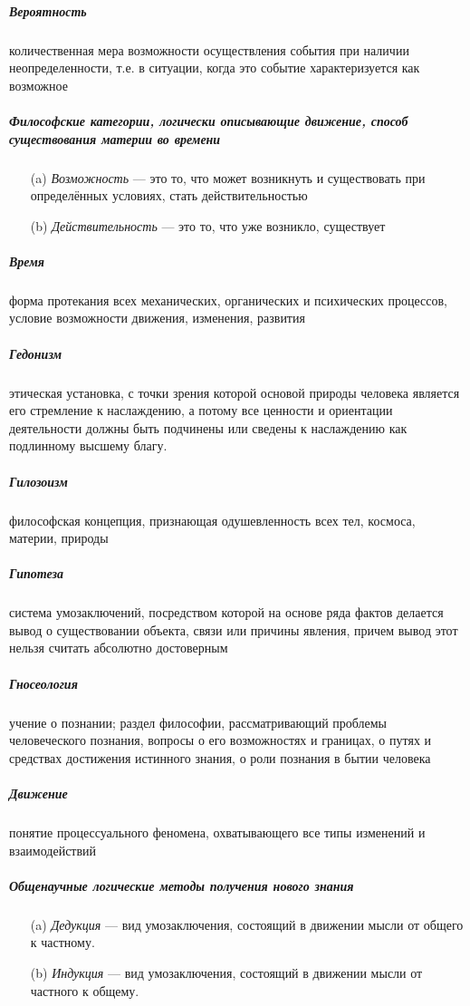 \documentclass[a4paper, 12pt]{article}
\theoremstyle{plain} %
\theoremstyle{definition} %
\theoremstyle{remark} %
\begin{document}
\subparagraph{Вероятность}
    количественная мера возможности осуществления события при наличии неопределенности, т.е. в ситуации, когда это событие характеризуется как возможное

\subparagraph{Философские категории, логически описывающие движение, способ существования материи во времени}
\begin{itemize}
	\item[(a)] \emph{Возможность} --- это то, что может возникнуть и существовать при определённых условиях, стать действительностью
	\item[(b)] \emph{Действительность} --- это то, что уже возникло, существует
\end{itemize}

\subparagraph{Время}
    форма протекания всех механических, органических и психических процессов, условие возможности движения, изменения, развития

\subparagraph{Гедонизм}
    этическая установка, с точки зрения которой основой природы человека является его стремление к наслаждению, а потому все ценности и ориентации деятельности должны быть подчинены или сведены к наслаждению как подлинному высшему благу.

\subparagraph{Гилозоизм}
    философская концепция, признающая одушевленность всех тел, космоса, материи, природы

\subparagraph{Гипотеза}
    система умозаключений, посредством которой на основе ряда фактов делается вывод о существовании объекта, связи или причины явления, причем вывод этот нельзя считать абсолютно достоверным

\subparagraph{Гносеология}
    учение о познании; раздел философии, рассматривающий проблемы человеческого познания, вопросы о его возможностях и границах, о путях и средствах достижения истинного знания, о роли познания в бытии человека

\subparagraph{Движение}
	понятие процессуального феномена, охватывающего все типы изменений и взаимодействий

\subparagraph{Общенаучные логические методы получения нового знания}
\begin{itemize}
	\item[(a)] \emph{Дедукция} --- вид умозаключения, состоящий в движении мысли от общего к частному.
	\item[(b)] \emph{Индукция} --- вид умозаключения, состоящий в движении мысли от частного к общему.
\end{itemize}
\end{document}
